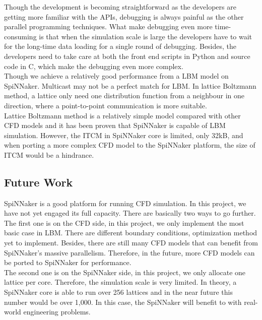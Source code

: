 Though the development is becoming straightforward as the developers are getting more familiar with the APIs, debugging is always painful as the other parallel programming techniques. What make debugging even more time-consuming is that when the simulation scale is large the developers have to wait for the long-time data loading for a single round of debugging. Besides, the developers need to take care at both the front end scripts in Python and source code in C, which make the debugging even more complex. \\

Though we achieve a relatively good performance from a LBM model on SpiNNaker. Multicast may not be a perfect match for LBM. In lattice Boltzmann method, a lattice only need one distribution function from a neighbour in one direction, where a point-to-point communication is more suitable.\\

Lattice Boltzmann method is a relatively simple model compared with other CFD models and it has been proven that SpiNNaker is capable of LBM simulation. However, the ITCM in SpiNNaker core is limited, only 32kB, and when porting a more complex CFD model to the SpiNNaker platform, the size of ITCM would be a hindrance. \\

 



\subsection{Future Work} \label{sec:future_work}
SpiNNaker is a good platform for running CFD simulation. In this project, we have not yet engaged its full capacity. There are basically two ways to go further.\\

The first one is on the CFD side, in this project, we only implement the most basic case in LBM. There are different boundary conditions, optimization method yet to implement. Besides, there are still many CFD models that can benefit from SpiNNaker's massive parallelism. Therefore, in the future, more CFD models can be ported to SpiNNaker for performance. \\

The second one is on the SpiNNaker side, in this project, we only allocate one lattice per core. Therefore, the simulation scale is very limited. In theory, a SpiNNaker core is able to run over 256 lattices and in the near future this number would be over 1,000. In this case, the SpiNNaker will benefit to with real-world engineering problems.\\




